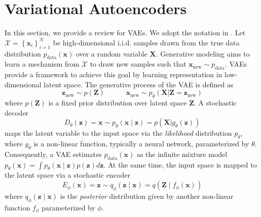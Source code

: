 \documentclass{article}
\def\bx{\mathbf{x}}
\def\bX{\mathbf{X}}
\def\bz{\mathbf{z}}
\def\bZ{\mathbf{Z}}
\theoremstyle{plain}
\theoremstyle{definition}
\begin{document}
\section{Variational Autoencoders}
\label{sec:variational_autoencoders}
In this section, we provide a review for VAEs. We adopt the notation in \citet{ghosh2019variational}. Let $\mathcal{X} = \left\{ \bx_i \right\}_{i=1}^N$ be high-dimensional i.i.d. samples drawn from the true data distribution $p_{\textrm{data}}(\bx)$ over a random variable $\bX$. Generative modeling aims to learn a mechanism from $\mathcal{X}$ to draw new samples such that $\bx_{\textrm{new}} \sim p_{\textrm{data}}$. VAEs provide a framework to achieve this goal by learning representation in low-dimensional latent space. The generative process of the VAE is defined as
\begin{equation}
\bz_{\textrm{new}} \sim p(\bZ) \quad \quad \quad \bx_{\textrm{new}} \sim p_{\theta}(\bX | \bZ = \bz_{\textrm{new}})
\end{equation}
where $p(\bZ)$ is a fixed prior distribution over latent space $\bZ$. A stochastic decoder
\begin{equation}
D_{\theta}(\bz) = \bx \sim p_{\theta}(\bx \mid \bz) = p(\bX | g_{\theta}(\bz))
\end{equation}
maps the latent variable to the input space via the \textit{likelihood} distribution $p_{\theta}$, where $g_{\theta}$ is a non-linear function, typically a neural network, parameterized by $\theta$. Consequently, a VAE estimates $p_{\textrm{data}}(\bx)$ as the infinite mixture model $p_{\theta}(\bx) = \int p_{\theta}(\bx \mid \bz) p(\bz) d\bz$. At the same time, the input space is mapped to the latent space via a stochastic encoder
\begin{equation}
E_{\phi}(\bx) = \bz \sim q_{\phi}(\bz \mid \bx) = q(\bZ \mid f_{\phi}(\bx))
\end{equation}
where $q_{\phi}(\bz \mid \bx)$ is the \textit{posterior} distribution given by another non-linear function $f_{\phi}$ parameterized by $\phi$.
\end{document}
